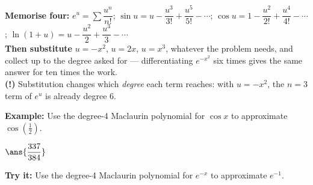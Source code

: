 \documentclass[12pt]{article}
\begin{document}
\begin{formulabox}
\textbf{Memorise four:} $e^u = \sum \dfrac{u^n}{n!}$; \;
$\sin u = u - \dfrac{u^3}{3!} + \dfrac{u^5}{5!} - \cdots$; \;
$\cos u = 1 - \dfrac{u^2}{2!} + \dfrac{u^4}{4!} - \cdots$; \;
$\ln(1+u) = u - \dfrac{u^2}{2} + \dfrac{u^3}{3} - \cdots$\\[3pt]
\textbf{Then substitute} $u = -x^2$, $u = 2x$, $u = x^3$, whatever the problem
needs, and collect up to the degree asked for --- differentiating
$e^{-x^2}$ six times gives the same answer for ten times the work.\\[3pt]
\textbf{(!)} Substitution changes which \emph{degree} each term reaches: with
$u = -x^2$, the $n = 3$ term of $e^u$ is already degree $6$.
\end{formulabox}
\begin{examplebox}
\textbf{Example:} Use the degree-4 Maclaurin polynomial for $\cos x$ to
approximate $\cos\!\left(\tfrac12\right)$.
\par
$\ans{\dfrac{337}{384}}$
\end{examplebox}
\begin{tryitbox}
\textbf{Try it:} Use the degree-4 Maclaurin polynomial for $e^{-x}$ to
approximate $e^{-1}$.\\[2pt]
\end{tryitbox}
\end{document}
